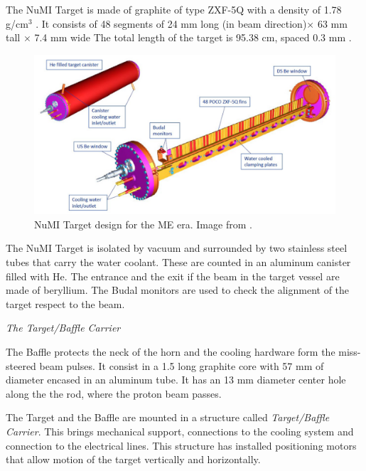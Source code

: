 The NuMI Target is made of graphite of type ZXF-5Q with a density of 1.78 g/cm$^3$ \cite{Numi}. It consists of 48 segments of 24 mm long (in beam direction)$\times$ 63 mm tall $\times$ 7.4 mm wide The total length of the target is 95.38 cm, spaced 0.3 mm \cite{BenThesis}.

\begin{figure}[!htb]
\centering
\includegraphics[scale=0.33]{Figures/Chapter2/NuMITarget.png}
        \caption{NuMI Target design for the ME era. Image from \cite{NuMITarget}.} 
\label{fig:MnvExp:NuMI:NuMITarget}
\end{figure}

The NuMI Target is isolated by vacuum and surrounded by two stainless steel tubes that carry the water coolant. These are counted in an aluminum canister filled with He. The entrance and the exit if the beam in the target vessel are made of beryllium. The Budal monitors \cite{Budal} are used to check the alignment of the target respect to the beam. 

\textit{The Target/Baffle Carrier}

The Baffle \cite{NOvATDR} protects the neck of the horn and the cooling hardware form the miss-steered beam pulses. It consist in a 1.5 long graphite core with 57 mm of diameter encased in an aluminum tube. It has an 13 mm diameter center hole along the the rod, where the proton beam passes. 

The Target and the Baffle are mounted in a structure called \textit{Target/Baffle Carrier}. This brings mechanical support, connections to the cooling system and connection to the electrical lines. This structure has installed positioning motors that allow motion of the target vertically and horizontally. 

